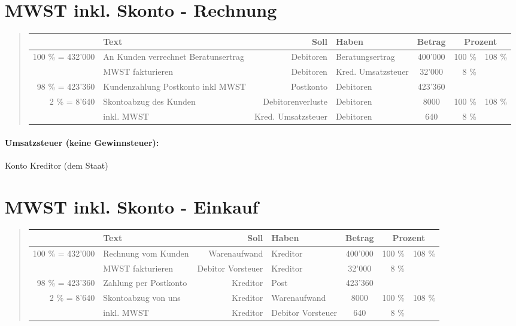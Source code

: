 \section*{MWST inkl. Skonto - Rechnung}
\begin{verse}
\begin{tabular}{r|>{\raggedright}p{4cm}|r|l|c|r|r|}
\cline{2-7} 
 & Text & Soll & Haben & Betrag & \multicolumn{2}{c|}{Prozent}\tabularnewline
\hline 
\multirow{2}{*}{100 \% = 432'000} & An Kunden verrechnet Beratunsertrag & Debitoren & Beratungsertrag & 400'000 & 100 \% & \multirow{2}{*}{108 \%}\tabularnewline
\cline{2-6} 
 & MWST fakturieren & Debitoren & Kred. Umsatzsteuer & 32'000 & 8 \% & \tabularnewline
\hline 
98 \% = 423'360  & Kundenzahlung Postkonto inkl MWST & Postkonto & Debitoren & 423'360 & \multicolumn{2}{r|}{}\tabularnewline
\hline 
\multirow{2}{*}{2 \% = 8'640 } & Skontoabzug des Kunden  & Debitorenverluste & Debitoren & 8000 & 100 \%  & \multirow{2}{*}{108 \%}\tabularnewline
\cline{2-6} 
 & inkl. MWST & Kred. Umsatzsteuer & Debitoren & 640 & 8 \% & \tabularnewline
\hline 
\end{tabular}
\end{verse}

\paragraph*{Umsatzsteuer (keine Gewinnsteuer): }

Konto Kreditor (dem Staat)


\section*{MWST inkl. Skonto - Einkauf}
\begin{verse}
\begin{tabular}{r|>{\raggedright}p{4cm}|r|l|c|r|r|}
\cline{2-7} 
 & Text & Soll & Haben & Betrag & \multicolumn{2}{c|}{Prozent}\tabularnewline
\hline 
\multirow{2}{*}{100 \% = 432'000} & Rechnung vom Kunden & Warenaufwand & Kreditor & 400'000 & 100 \% & \multirow{2}{*}{108 \%}\tabularnewline
\cline{2-6} 
 & MWST fakturieren & Debitor Vorsteuer & Kreditor & 32'000 & 8 \% & \tabularnewline
\hline 
98 \% = 423'360  & Zahlung per Postkonto & Kreditor & Post & 423'360 & \multicolumn{2}{r|}{}\tabularnewline
\hline 
\multirow{2}{*}{2 \% = 8'640 } & Skontoabzug von uns & Kreditor & Warenaufwand & 8000 & 100 \%  & \multirow{2}{*}{108 \%}\tabularnewline
\cline{2-6} 
 & inkl. MWST & Kreditor & Debitor Vorsteuer & 640 & 8 \% & \tabularnewline
\hline 
\end{tabular}
\end{verse}

